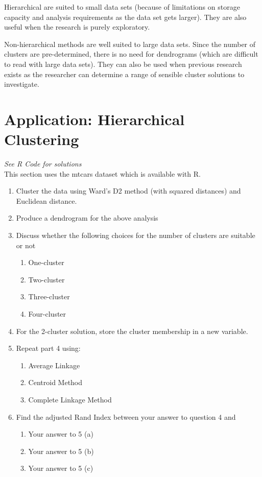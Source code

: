 \documentclass{article}
\begin{document}
\begin{enumerate}
{  Hierarchical are suited to small data sets (because of limitations on storage capacity and analysis requirements as the data set gets larger).  They are also useful when the research is purely exploratory.
  
  Non-hierarchical methods are well suited to large data sets.  Since the number of clusters are pre-determined, there is no need for dendrograms (which are difficult to read with large data sets).  They can also be used when previous research exists as the researcher can determine a range of sensible cluster solutions to investigate.	
  }
\end{enumerate}
\section*{Application: Hierarchical Clustering}
{\em See R Code for solutions}\\
This section uses the mtcars dataset which is available with R.
\begin{enumerate}
	\item Cluster the data using Ward's D2 method (with squared distances) and Euclidean distance.
	\item Produce a dendrogram for the above analysis
	\item Discuss whether the following choices for the number of clusters are suitable	or not
	\begin{enumerate}
		\item One-cluster
		\item Two-cluster
		\item Three-cluster
		\item Four-cluster
	\end{enumerate}

	\item  For the 2-cluster solution, store the cluster membership in a new variable.
	\item  Repeat part 4 using:
	\begin{enumerate}
		\item Average Linkage
		\item Centroid Method
		\item Complete Linkage Method
	\end{enumerate}

	\item Find the adjusted Rand Index between your answer to question 4 and
	\begin{enumerate}
		\item Your answer to 5 (a)
		\item Your answer to 5 (b)
		\item Your answer to 5 (c)
	\end{enumerate}
\end{enumerate}
\end{document}
